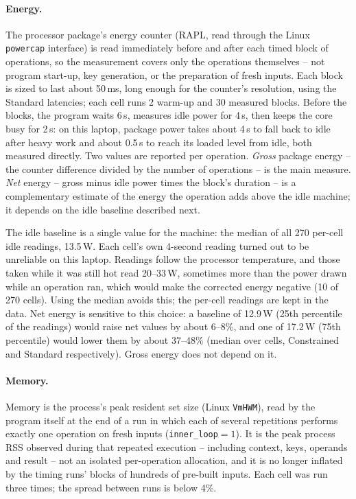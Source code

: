 \paragraph{Energy.} The processor package's energy counter (RAPL, read through the Linux \texttt{powercap} interface) is read immediately before and after each timed block of operations, so the measurement covers only the operations themselves -- not program start-up, key generation, or the preparation of fresh inputs. Each block is sized to last about 50\,ms, long enough for the counter's resolution, using the Standard latencies; each cell runs 2 warm-up and 30 measured blocks. Before the blocks, the program waits 6\,s, measures idle power for 4\,s, then keeps the core busy for 2\,s: on this laptop, package power takes about 4\,s to fall back to idle after heavy work and about 0.5\,s to reach its loaded level from idle, both measured directly. Two values are reported per operation. \emph{Gross} package energy -- the counter difference divided by the number of operations -- is the main measure. \emph{Net} energy -- gross minus idle power times the block's duration -- is a complementary estimate of the energy the operation adds above the idle machine; it depends on the idle baseline described next.

The idle baseline is a single value for the machine: the median of all 270 per-cell idle readings, 13.5\,W. Each cell's own 4-second reading turned out to be unreliable on this laptop. Readings follow the processor temperature, and those taken while it was still hot read 20--33\,W, sometimes more than the power drawn while an operation ran, which would make the corrected energy negative (10 of 270 cells). Using the median avoids this; the per-cell readings are kept in the data. Net energy is sensitive to this choice: a baseline of 12.9\,W (25th percentile of the readings) would raise net values by about 6--8\%, and one of 17.2\,W (75th percentile) would lower them by about 37--48\% (median over cells, Constrained and Standard respectively). Gross energy does not depend on it.

\paragraph{Memory.} Memory is the process's peak resident set size (Linux \texttt{VmHWM}), read by the program itself at the end of a run in which each of several repetitions performs exactly one operation on fresh inputs (\texttt{inner\_loop}${=}1$). It is the peak process RSS observed during that repeated execution -- including context, keys, operands and result -- not an isolated per-operation allocation, and it is no longer inflated by the timing runs' blocks of hundreds of pre-built inputs. Each cell was run three times; the spread between runs is below 4\%.


